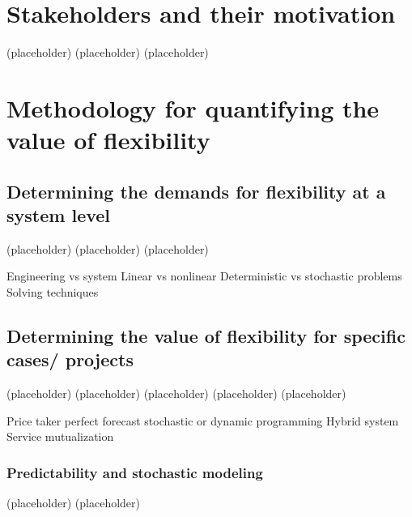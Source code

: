 \section{Stakeholders and their motivation}

(placeholder)
\newpage
(placeholder)
\newpage
(placeholder)
\newpage

\section{Methodology for quantifying the value of flexibility}
\subsection{Determining the demands for flexibility at a system level}
(placeholder)
\newpage
(placeholder)
\newpage
(placeholder)
\newpage

Engineering vs system
Linear vs nonlinear
Deterministic vs stochastic problems
Solving techniques

\subsection{Determining the value of flexibility for specific cases/ projects}
(placeholder)
\newpage
(placeholder)
\newpage
(placeholder)
\newpage
(placeholder)
\newpage
(placeholder)
\newpage

Price taker
perfect forecast
stochastic or dynamic programming
Hybrid system
Service mutualization

\subsubsection{Predictability and stochastic modeling}
\label{sec:perfect-forecast}
\cite{He2011}
\cite{Sioshansi2009}
\cite{Bathurst2003}
\cite{Drury2011}
\cite{Connolly2012}
\cite{Alipour2017}
(placeholder)
\newpage
(placeholder)
\newpage


